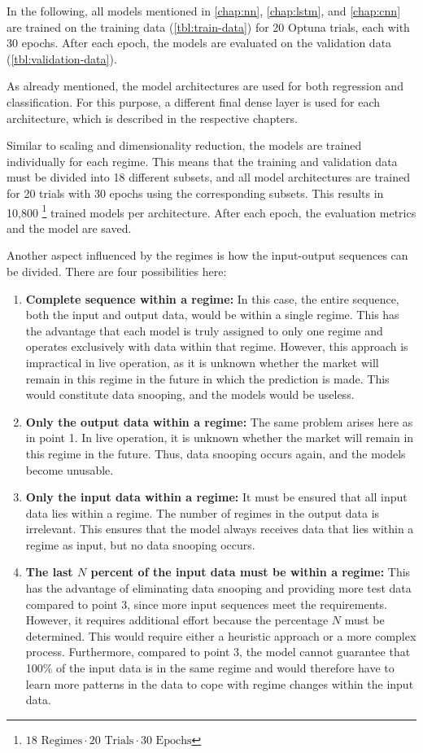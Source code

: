 In the following, all models mentioned in \autoref{chap:nn}, \autoref{chap:lstm}, and \autoref{chap:cnn} are trained on the training data (\autoref{tbl:train-data}) for 20 Optuna trials, each with 30 epochs.
After each epoch, the models are evaluated on the validation data (\autoref{tbl:validation-data}).

As already mentioned, the model architectures are used for both regression and classification.
For this purpose, a different final dense layer is used for each architecture, which is described in the respective chapters.

Similar to scaling and dimensionality reduction, the models are trained individually for each regime.
This means that the training and validation data must be divided into 18 different subsets, and all model architectures are trained for 20 trials with 30 epochs using the corresponding subsets.
This results in 10,800 \footnote{$18 \text{ Regimes} \cdot 20 \text{ Trials} \cdot 30 \text{ Epochs}$} trained models per architecture.
After each epoch, the evaluation metrics and the model are saved.

Another aspect influenced by the regimes is how the input-output sequences can be divided.
There are four possibilities here:

\begin{enumerate}
    \item \textbf{Complete sequence within a regime:} In this case, the entire sequence, both the input and output data, would be within a single regime.
    This has the advantage that each model is truly assigned to only one regime and operates exclusively with data within that regime.
    However, this approach is impractical in live operation, as it is unknown whether the market will remain in this regime in the future in which the prediction is made.
    This would constitute data snooping, and the models would be useless.
    \item \textbf{Only the output data within a regime:} The same problem arises here as in point 1.
    In live operation, it is unknown whether the market will remain in this regime in the future.
    Thus, data snooping occurs again, and the models become unusable.
    \item \textbf{Only the input data within a regime:} It must be ensured that all input data lies within a regime.
    The number of regimes in the output data is irrelevant.
    This ensures that the model always receives data that lies within a regime as input, but no data snooping occurs.
    \item \textbf{The last $N$ percent of the input data must be within a regime:} This has the advantage of eliminating data snooping and providing more test data compared to point 3, since more input sequences meet the requirements.
    However, it requires additional effort because the percentage $N$ must be determined.
    This would require either a heuristic approach or a more complex process.
    Furthermore, compared to point 3, the model cannot guarantee that 100\% of the input data is in the same regime and would therefore have to learn more patterns in the data to cope with regime changes within the input data.
\end{enumerate}

